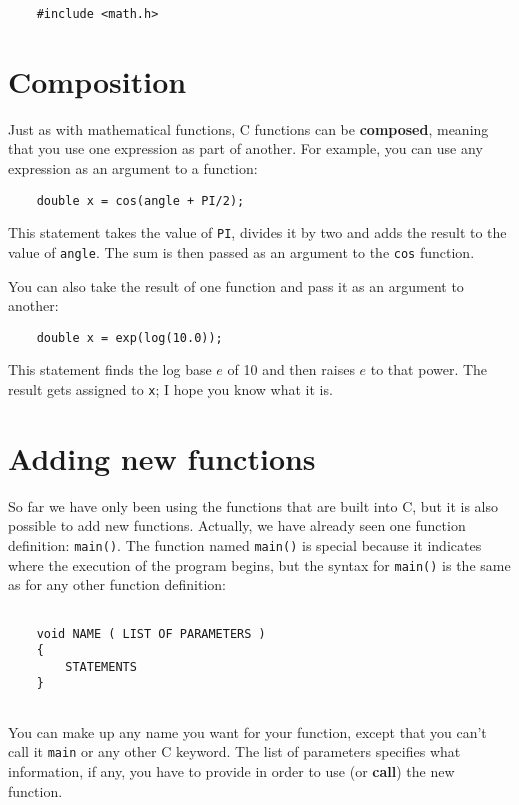 \begin{verbatim}
    #include <math.h>
\end{verbatim}
%
\section {Composition}
\label{composition}

Just as with mathematical functions, C functions can be {\bf
composed}, meaning that you use one expression as part of another.
For example, you can use any expression as an argument to a function:

\begin{verbatim}
    double x = cos(angle + PI/2);
\end{verbatim}
%
This statement takes the value of {\tt PI}, divides it by two and
adds the result to the value of {\tt angle}.  The sum is
then passed as an argument to the {\tt cos} function.

You can also take the result of one function and pass it as
an argument to another:

\begin{verbatim}
    double x = exp(log(10.0));
\end{verbatim}
%
This
statement finds the log base $e$ of 10 and then raises $e$ to that
power.  The result gets assigned to {\tt x}; I hope you know what it
is.


\section{Adding new functions}
So far we have only been using the functions that are built into C,
but it is also possible to add new functions.  Actually, we have already
seen one function definition: {\tt main()}.  The function named {\tt main()}
is special because it indicates where the execution of the program
begins, but the syntax for {\tt main()} is the same as for any other
function definition:

\begin{verbatim}

    void NAME ( LIST OF PARAMETERS ) 
    {
        STATEMENTS
    }
    
\end{verbatim}
%
You can make up any name you want for your function, except
that you can't call it {\tt main} or any other
C keyword.  The list of
parameters specifies what information, if any, you have to
provide in order to use (or {\bf call}) the new function.

